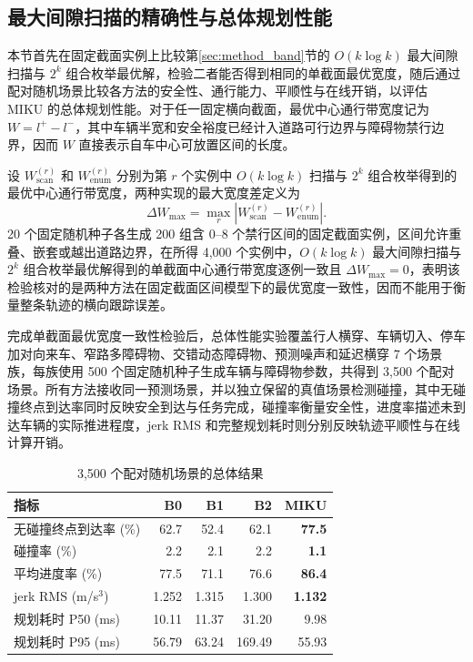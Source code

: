 \documentclass[a4paper,zihao=5]{ctexart}
\theoremstyle{definition}
\begin{document}
\subsection{最大间隙扫描的精确性与总体规划性能}
\label{subsec:exp_exactness}

本节首先在固定截面实例上比较第\ref{sec:method_band}节的 $O(k\log k)$ 最大间隙扫描与 $2^k$ 组合枚举最优解，检验二者能否得到相同的单截面最优宽度，随后通过配对随机场景比较各方法的安全性、通行能力、平顺性与在线开销，以评估 MIKU 的总体规划性能。对于任一固定横向截面，最优中心通行带宽度记为 $W=l^+-l^-$，其中车辆半宽和安全裕度已经计入道路可行边界与障碍物禁行边界，因而 $W$ 直接表示自车中心可放置区间的长度。

设 $W_{\mathrm{scan}}^{(r)}$ 和 $W_{\mathrm{enum}}^{(r)}$ 分别为第 $r$ 个实例中 $O(k\log k)$ 扫描与 $2^k$ 组合枚举得到的最优中心通行带宽度，两种实现的最大宽度差定义为
\begin{equation}
    \Delta W_{\max}=\max_r\left|W_{\mathrm{scan}}^{(r)}-W_{\mathrm{enum}}^{(r)}\right|.
    \label{eq:exp_width_difference}
\end{equation}
20 个固定随机种子各生成 200 组含 0--8 个禁行区间的固定截面实例，区间允许重叠、嵌套或越出道路边界，在所得 4,000 个实例中，$O(k\log k)$ 最大间隙扫描与 $2^k$ 组合枚举最优解得到的单截面中心通行带宽度逐例一致且 $\Delta W_{\max}=0$，表明该检验核对的是两种方法在固定截面区间模型下的最优宽度一致性，因而不能用于衡量整条轨迹的横向跟踪误差。

\label{subsec:exp_randomized}

完成单截面最优宽度一致性检验后，总体性能实验覆盖行人横穿、车辆切入、停车加对向来车、窄路多障碍物、交错动态障碍物、预测噪声和延迟横穿 7 个场景族，每族使用 500 个固定随机种子生成车辆与障碍物参数，共得到 3,500 个配对场景。所有方法接收同一预测场景，并以独立保留的真值场景检测碰撞，其中无碰撞终点到达率同时反映安全到达与任务完成，碰撞率衡量安全性，进度率描述未到达车辆的实际推进程度，jerk RMS 和完整规划耗时则分别反映轨迹平顺性与在线计算开销。

\begin{table}[htbp]
\centering
\caption{3,500 个配对随机场景的总体结果}
\label{tab:randomized_overall}
\small
\begin{tabular}{lrrrr}
\toprule
\textbf{指标} & \textbf{B0} & \textbf{B1} & \textbf{B2} & \textbf{MIKU} \\
\midrule
无碰撞终点到达率 (\%) & 62.7 & 52.4 & 62.1 & \textbf{77.5} \\
碰撞率 (\%) & 2.2 & 2.1 & 2.2 & \textbf{1.1} \\
平均进度率 (\%) & 77.5 & 71.1 & 76.6 & \textbf{86.4} \\
jerk RMS (m/s$^3$) & 1.252 & 1.315 & 1.300 & \textbf{1.132} \\
规划耗时 P50 (ms) & 10.11 & 11.37 & 31.20 & 9.98 \\
规划耗时 P95 (ms) & 56.79 & 63.24 & 169.49 & 55.93 \\
\bottomrule
\end{tabular}
\end{table}
\end{document}
